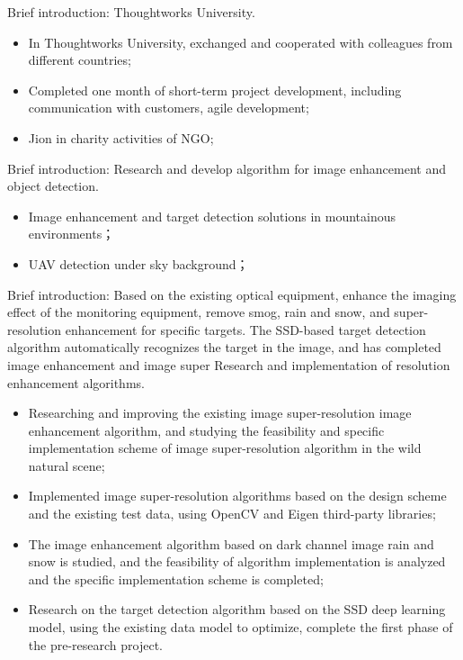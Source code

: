 \documentclass{resume}
\begin{document}
Brief introduction:  Thoughtworks University.
\begin{itemize}
  \item In Thoughtworks University, exchanged and cooperated with colleagues from different countries;
  \item Completed one month of short-term project development, including communication with customers, agile development;
  \item Jion in charity activities of NGO;
\end{itemize}

Brief introduction: Research and develop algorithm for image enhancement and object detection.
\begin{itemize}
  \item Image enhancement and target detection solutions in mountainous environments；
  \item UAV detection under sky background；
\end{itemize}

Brief introduction: Based on the existing optical equipment, enhance the imaging effect of the monitoring equipment, remove smog, rain and snow, and super-resolution enhancement for specific targets. The SSD-based target detection algorithm automatically recognizes the target in the image, and has completed image enhancement and image super Research and implementation of resolution enhancement algorithms.

\begin{itemize}
  \item Researching and improving the existing image super-resolution image enhancement algorithm, and studying the feasibility and specific implementation scheme of image super-resolution algorithm in the wild natural scene;
  \item Implemented image super-resolution algorithms based on the design scheme and the existing test data, using OpenCV and Eigen third-party libraries;
  \item The image enhancement algorithm based on dark channel image rain and snow is studied, and the feasibility of algorithm implementation is analyzed and the specific implementation scheme is completed;
  \item Research on the target detection algorithm based on the SSD deep learning model, using the existing data model to optimize, complete the first phase of the pre-research project.
\end{itemize}
\end{document}

